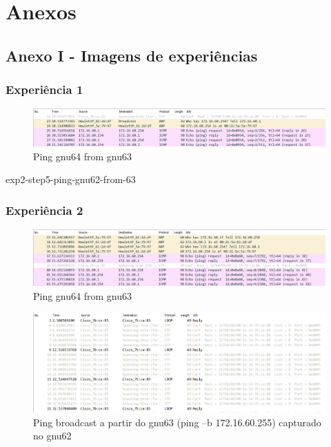 \documentclass[article, a4paper, 11pt, oneside]{memoir}
\begin{document}
\newpage
\chapter[Anexos][Anexos]{Anexos} \label{\thechapter}

\section{Anexo I - Imagens de experiências}
\subsection{Experiência 1}

\begin{figure}[h]
	\centering
\includegraphics[scale=0.55]{exp1-gnu63.png}
\caption{Ping gnu64 from gnu63}
\end{figure}

exp2-step5-ping-gnu62-from-63

\subsection{Experiência 2}
\begin{figure}[h]
	\centering
\includegraphics[scale=0.55]{exp2-step5-ping-gnu64-from-gnu63.png}
\caption{Ping gnu64 from gnu63}
\end{figure}

\newpage
\begin{figure}[h]
	\centering
\includegraphics[scale=0.55]{exp2-step8-broadcast-gnu63-from-gnu62.png}
\caption{Ping broadcast a partir do gnu63 (ping –b 172.16.60.255) capturado no gnu62}
\end{figure}
\end{document}
